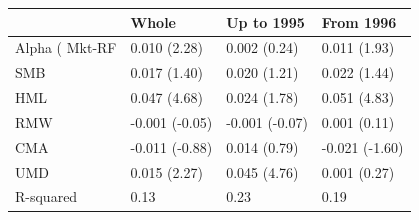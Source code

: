 \begin{tabular}{llll}
\toprule
 & Whole & Up to 1995 & From 1996 \\
\midrule
Alpha (%
Mkt-RF & 0.010 (2.28) & 0.002 (0.24) & 0.011 (1.93) \\
SMB & 0.017 (1.40) & 0.020 (1.21) & 0.022 (1.44) \\
HML & 0.047 (4.68) & 0.024 (1.78) & 0.051 (4.83) \\
RMW & -0.001 (-0.05) & -0.001 (-0.07) & 0.001 (0.11) \\
CMA & -0.011 (-0.88) & 0.014 (0.79) & -0.021 (-1.60) \\
UMD & 0.015 (2.27) & 0.045 (4.76) & 0.001 (0.27) \\
R-squared & 0.13 & 0.23 & 0.19 \\
\bottomrule
\end{tabular}
